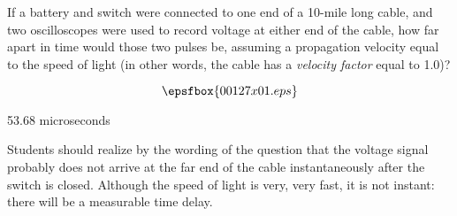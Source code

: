 

If a battery and switch were connected to one end of a 10-mile long cable, and two oscilloscopes were used to record voltage at either end of the cable, how far apart in time would those two pulses be, assuming a propagation velocity equal to the speed of light (in other words, the cable has a {\it velocity factor} equal to 1.0)?

$$\epsfbox{00127x01.eps}$$







53.68 microseconds







Students should realize by the wording of the question that the voltage signal probably does not arrive at the far end of the cable instantaneously after the switch is closed.  Although the speed of light is very, very fast, it is not instant: there will be a measurable time delay.




